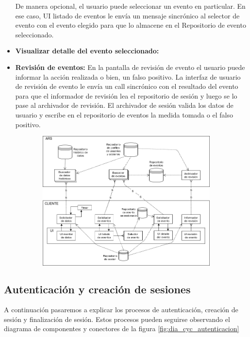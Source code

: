 \begin{itemize}
    De manera opcional, el usuario puede seleccionar un evento en particular. En ese caso, UI listado de eventos le envía un mensaje sincrónico al selector de evento con el evento elegido para que lo almacene en el Repositorio de evento seleccionado.
    \item \textbf{Visualizar detalle del evento seleccionado:}
    \item \textbf{Revisión de eventos:} En la pantalla de revisión de evento el usuario puede informar la acción realizada o bien, un falso positivo. La interfaz de usuario de revisión de evento le envía un call sincrónico con el resultado del evento para que el informador de revisión lea el repositorio de sesión y luego se lo pase al archivador de revisión. El archivador de sesión valida los datos de usuario y escribe en el repositorio de eventos la medida tomada o el falso positivo.
\end{itemize}

\begin{figure}[H]
  \begin{subfigure}{\textwidth}
    \includegraphics[width=\textwidth]{imagenes/diagramas/interaccionConClientes.png}
  \end{subfigure}
  \label{}
  \caption{}
\end{figure}

\subsection{Autenticación y creación de sesiones}

\par A continuación pasaremos a explicar los procesos de autenticación, creación de sesión y finalización de sesión. Estos procesos pueden seguirse observando el diagrama de componentes y conectores de la figura \ref{fig:dia_cyc_autenticacion}

